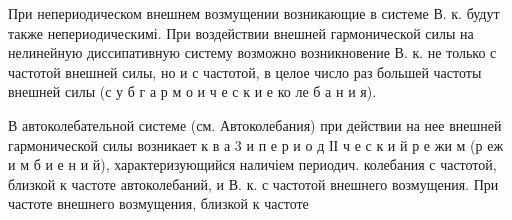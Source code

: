 \documentclass[10pt]{article}
\begin{document}
При непериодическом внешнем возмущении возникающие в системе В. к. будут также непериодическимі. При воздействии внешней гармонической силы на нелинейную диссипативную систему возможно возникновение В. к. не только с частотой внешней силы, но и с частотой, в целое число раз большей частоты внешней силы (с у б г а р м о и ч е с к и е ко ле б а н и я).



В автоколебательной системе (см. Автоколебания) при действии на нее внешней гармонической силы возникает к в а 3 и п е р и о д ІІ ч е с к и й р е жи м (р еж и м б и е н и й), характеризующийся наличіем периодич. колебания с частотой, близкой к частоте автоколебаний, и В. к. с частотой внешнего возмущения. При частоте внешнего возмущения, близкой к частоте
\end{document}
